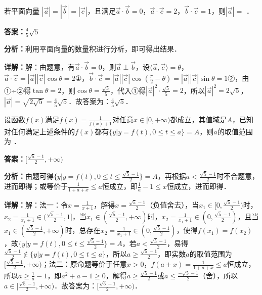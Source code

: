\begin{question}[points=5]
若平面向量 $|\vec{a}|=|\vec{b}|=|\vec{c}|$，且满足$\vec{a}\cdot\vec{b}=0$，$\vec{a}\cdot\vec{c}=2$，$\vec{b}\cdot\vec{c}=1$，则$|\vec{a}|=$ ．
\begin{solution}
\textbf{答案：}$\frac{4}{5}\sqrt{5}$

\textbf{分析：}利用平面向量的数量积进行分析，即可得出结果．

\textbf{详解：}解：由题意，有$\vec{a}\cdot\vec{b}=0$，则$\vec{a}\perp\vec{b}$，设$\langle\vec{a},\vec{c}\rangle=\theta$，$\vec{a}\cdot\vec{c}=|\vec{a}||\vec{c}|\cos\theta=2$①，$\vec{b}\cdot\vec{c}=|\vec{a}||\vec{c}|\cos(\frac{\pi}{2}-\theta)=|\vec{a}||\vec{c}|\sin\theta=1$②，由①÷②得$\tan\theta=2$，则$\cos\theta=\frac{\sqrt{5}}{5}$，代入①得$|\vec{a}|^2\cdot\frac{\sqrt{5}}{5}=2$，所以$|\vec{a}|^2=2\sqrt{5}$，$|\vec{a}|=\sqrt{2\sqrt{5}}=\frac{4}{5}\sqrt{5}$．故答案为：$\frac{4}{5}\sqrt{5}$．
\end{solution}
\end{question}

\begin{question}[points=5]
设函数$f(x)$满足$f(x)=\frac{1}{f(x)+1}$对任意$x\in[0,+\infty)$都成立，其值域是$A$，已知对任何满足上述条件的$f(x)$都有$\{y|y=f(t),0\leq t\leq a\}=A$，则$a$的取值范围为 ．
\fillin[{$[\frac{\sqrt{5}-1}{2},+\infty)$}]
\begin{solution}
\textbf{答案：}$[\frac{\sqrt{5}-1}{2},+\infty)$

\textbf{分析：}由题可得$\{y|y=f(t),0\leq t\leq \frac{\sqrt{5}-1}{2}\}=A$，再根据$a<\frac{\sqrt{5}-1}{2}$时不合题意，进而即得；或等价于$\frac{1}{1+a+x}\leq a$恒成立，即$\frac{1}{a}-1\leq x$恒成立，进而即得．

\textbf{详解：}解：法一：令$x=\frac{1}{x+1}$，解得$x=\frac{\sqrt{5}-1}{2}$（负值舍去），当$x_1\in[0,\frac{\sqrt{5}-1}{2})$时，$x_2=\frac{1}{x_1+1}\in(\frac{\sqrt{5}-1}{2},1]$，当$x_1\in(\frac{\sqrt{5}-1}{2},+\infty)$时，$x_2=\frac{1}{x_1+1}\in(0,\frac{\sqrt{5}-1}{2})$，且当$x_1\in(\frac{\sqrt{5}-1}{2},+\infty)$时，总存在$x_2=\frac{1}{x_1+1}\in(0,\frac{\sqrt{5}-1}{2})$，使得$f(x_1)=f(x_2)$，故$\{y|y=f(t),0\leq t\leq \frac{\sqrt{5}-1}{2}\}=A$，若$a<\frac{\sqrt{5}-1}{2}$，易得$\frac{\sqrt{5}-1}{2}\notin\{y|y=f(t),0\leq t\leq a\}$，所以$a\geq\frac{\sqrt{5}-1}{2}$，即实数$a$的取值范围为$[\frac{\sqrt{5}-1}{2},+\infty)$；法二：原命题等价于任意$x>0$，$f(a+x)=\frac{1}{1+a+x}\leq a$恒成立，所以$a\geq\frac{1}{a}-1$，即$a^2+a-1\geq0$，解得$a\geq\frac{\sqrt{5}-1}{2}$或$a\leq\frac{-\sqrt{5}-1}{2}$（舍），所以$a\in[\frac{\sqrt{5}-1}{2},+\infty)$．故答案为：$[\frac{\sqrt{5}-1}{2},+\infty)$．
\end{solution}
\end{question}

